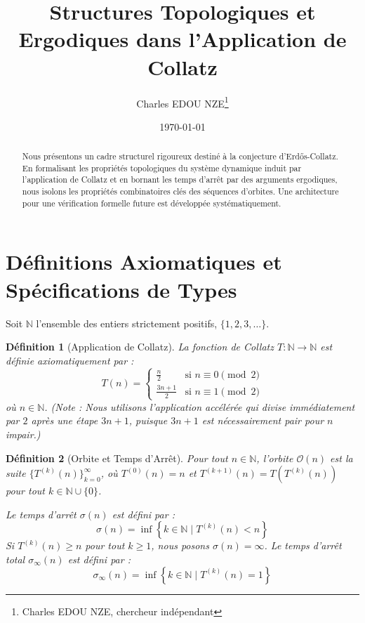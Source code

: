 \documentclass[12pt,a4paper]{article}
\title{Structures Topologiques et Ergodiques dans l'Application de Collatz}
\author{Charles EDOU NZE\thanks{Charles EDOU NZE, chercheur ind\'ependant}}
\date{\today}
\newtheorem{definition}{D\'efinition}
\begin{document}
\maketitle

\begin{abstract}
Nous pr\'esentons un cadre structurel rigoureux destin\'e \`a la conjecture d'Erd\H{o}s-Collatz. En formalisant les propri\'et\'es topologiques du syst\`eme dynamique induit par l'application de Collatz et en bornant les temps d'arr\^et par des arguments ergodiques, nous isolons les propri\'et\'es combinatoires cl\'es des s\'equences d'orbites. Une architecture pour une v\'erification formelle future est d\'evelopp\'ee syst\'ematiquement.
\end{abstract}

\tableofcontents
\newpage

\section{D\'efinitions Axiomatiques et Sp\'ecifications de Types}

Soit $\mathbb{N}$ l'ensemble des entiers strictement positifs, $\{1, 2, 3, \ldots \}$.

\begin{definition}[Application de Collatz]
La fonction de Collatz $T : \mathbb{N} \to \mathbb{N}$ est d\'efinie axiomatiquement par :
$$
T(n) =
\begin{cases}
\frac{n}{2} & \text{si } n \equiv 0 \pmod 2 \\
\frac{3n + 1}{2} & \text{si } n \equiv 1 \pmod 2
\end{cases}
$$
o\`u $n \in \mathbb{N}$. (Note : Nous utilisons l'application acc\'el\'er\'ee qui divise imm\'ediatement par $2$ apr\`es une \'etape $3n+1$, puisque $3n+1$ est n\'ecessairement pair pour $n$ impair.)
\end{definition}

\begin{definition}[Orbite et Temps d'Arr\^et]
Pour tout $n \in \mathbb{N}$, l'orbite $\mathcal{O}(n)$ est la suite $\{ T^{(k)}(n) \}_{k=0}^{\infty}$, o\`u $T^{(0)}(n) = n$ et $T^{(k+1)}(n) = T(T^{(k)}(n))$ pour tout $k \in \mathbb{N} \cup \{0\}$.

Le temps d'arr\^et $\sigma(n)$ est d\'efini par :
$$ \sigma(n) = \inf \left\{ k \in \mathbb{N} \mid T^{(k)}(n) < n \right\} $$
Si $T^{(k)}(n) \geq n$ pour tout $k \geq 1$, nous posons $\sigma(n) = \infty$.
Le temps d'arr\^et total $\sigma_{\infty}(n)$ est d\'efini par :
$$ \sigma_{\infty}(n) = \inf \left\{ k \in \mathbb{N} \mid T^{(k)}(n) = 1 \right\} $$
\end{definition}
\end{document}
